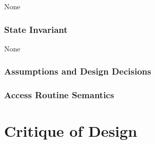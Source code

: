 \documentclass[12pt]{article}
\begin{document}
None

\subsubsection* {State Invariant}

None

\subsubsection* {Assumptions and Design Decisions}

\subsubsection* {Access Routine Semantics}

\newpage

\section*{Critique of Design}
\end{document}
